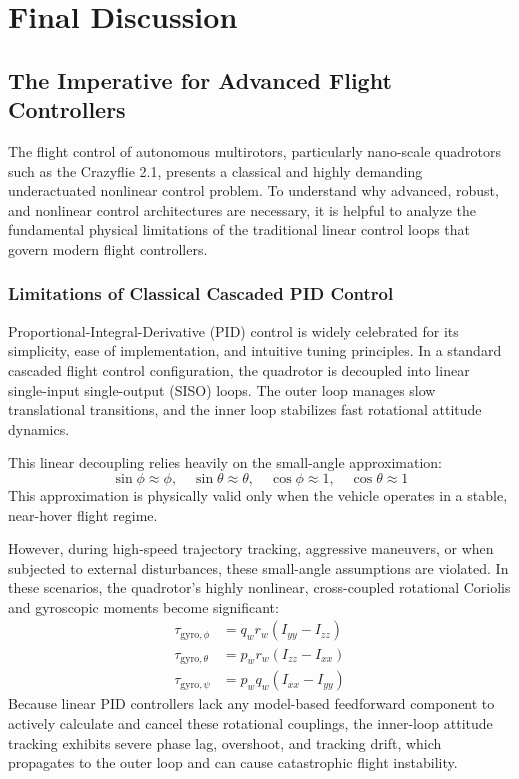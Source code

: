 \chapter{Final Discussion}
\label{ch:final_discussion}

\section{The Imperative for Advanced Flight Controllers}
The flight control of autonomous multirotors, particularly nano-scale quadrotors such as the Crazyflie 2.1, presents a classical and highly demanding underactuated nonlinear control problem. To understand why advanced, robust, and nonlinear control architectures are necessary, it is helpful to analyze the fundamental physical limitations of the traditional linear control loops that govern modern flight controllers.

\subsection{Limitations of Classical Cascaded PID Control}
Proportional-Integral-Derivative (PID) control is widely celebrated for its simplicity, ease of implementation, and intuitive tuning principles. In a standard cascaded flight control configuration, the quadrotor is decoupled into linear single-input single-output (SISO) loops. The outer loop manages slow translational transitions, and the inner loop stabilizes fast rotational attitude dynamics. 

This linear decoupling relies heavily on the small-angle approximation:
\begin{equation}
\sin\phi \approx \phi, \quad \sin\theta \approx \theta, \quad \cos\phi \approx 1, \quad \cos\theta \approx 1
\end{equation}
This approximation is physically valid only when the vehicle operates in a stable, near-hover flight regime. 

However, during high-speed trajectory tracking, aggressive maneuvers, or when subjected to external disturbances, these small-angle assumptions are violated. In these scenarios, the quadrotor's highly nonlinear, cross-coupled rotational Coriolis and gyroscopic moments become significant:
\begin{align}
\tau_{\text{gyro},\phi} &= q_w r_w (I_{yy} - I_{zz}) \\
\tau_{\text{gyro},\theta} &= p_w r_w (I_{zz} - I_{xx}) \\
\tau_{\text{gyro},\psi} &= p_w q_w (I_{xx} - I_{yy})
\end{align}
Because linear PID controllers lack any model-based feedforward component to actively calculate and cancel these rotational couplings, the inner-loop attitude tracking exhibits severe phase lag, overshoot, and tracking drift, which propagates to the outer loop and can cause catastrophic flight instability.

